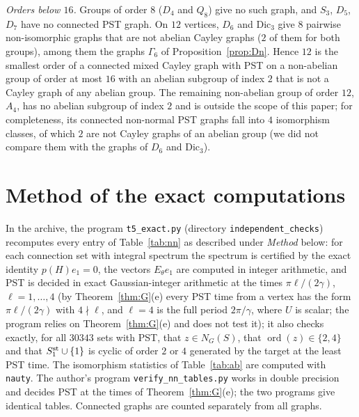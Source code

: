 \documentclass[preprint,11pt]{elsarticle}
\theoremstyle{definition}
\theoremstyle{remark}
\DeclareMathOperator{\ord}{ord}
\begin{document}
\emph{Orders below $16$.} Groups of order $8$ ($D_4$ and $Q_8$) give no such graph, and $S_3$, $D_5$, $D_7$ have no connected PST graph. On $12$ vertices, $D_6$ and $\mathrm{Dic}_3$ give $8$ pairwise non-isomorphic graphs that are not abelian Cayley graphs ($2$ of them for both groups), among them the graphs $\Gamma_6$ of Proposition~\ref{prop:Dn}. Hence $12$ is the smallest order of a connected mixed Cayley graph with PST on a non-abelian group of order at most $16$ with an abelian subgroup of index $2$ that is not a Cayley graph of any abelian group. The remaining non-abelian group of order $12$, $A_4$, has no abelian subgroup of index $2$ and is outside the scope of this paper; for completeness, its connected non-normal PST graphs fall into $4$ isomorphism classes, of which $2$ are not Cayley graphs of an abelian group (we did not compare them with the graphs of $D_6$ and $\mathrm{Dic}_3$).


\section{Method of the exact computations}\label{app:comp}\label{sec:comp}

\begin{sloppypar}
In the archive, the program \texttt{t5\_exact.py} (directory \texttt{independent\_checks}) recomputes every entry of Table~\ref{tab:nn} as described under \emph{Method} below: for each connection set with integral spectrum the spectrum is certified by the exact identity $p(H)e_1=0$, the vectors $E_\theta e_1$ are computed in integer arithmetic, and PST is decided in exact Gaussian-integer arithmetic at the times $\pi\ell/(2\gamma)$, $\ell=1,\dots,4$ (by Theorem~\ref{thm:G}(e) every PST time from a vertex has the form $\pi\ell/(2\gamma)$ with $4\nmid\ell$, and $\ell=4$ is the full period $2\pi/\gamma$, where $U$ is scalar; the program relies on Theorem~\ref{thm:G}(e) and does not test it); it also checks exactly, for all $30343$ sets with PST, that $z\in N_G(S)$, that $\ord(z)\in\{2,4\}$ and that $S_1^{\rm st}\cup\{1\}$ is cyclic of order $2$ or $4$ generated by the target at the least PST time. The isomorphism statistics of Table~\ref{tab:ab} are computed with \texttt{nauty}. The author's program \texttt{verify\_nn\_tables.py} works in double precision and decides PST at the times of Theorem~\ref{thm:G}(e); the two programs give identical tables. Connected graphs are counted separately from all graphs.
\end{sloppypar}
\end{document}
